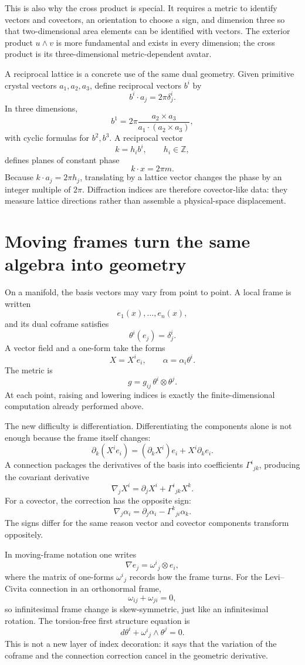 This is also why the cross product is special.  It requires a metric to identify vectors and covectors, an orientation to choose a sign, and dimension three so that two-dimensional area elements can be identified with vectors.  The exterior product \(u\wedge v\) is more fundamental and exists in every dimension; the cross product is its three-dimensional metric-dependent avatar.

A reciprocal lattice is a concrete use of the same dual geometry.  Given primitive crystal vectors \(a_1,a_2,a_3\), define reciprocal vectors \(b^i\) by
\[
  b^i\cdot a_j=2\pi\delta^i_j.
\]
In three dimensions,
\[
  b^1=2\pi\frac{a_2\times a_3}
  {a_1\cdot(a_2\times a_3)},
\]
with cyclic formulas for \(b^2,b^3\).  A reciprocal vector
\[
  k=h_i b^i,
  \qquad h_i\in\mathbb Z,
\]
defines planes of constant phase
\[
  k\cdot x=2\pi m.
\]
Because \(k\cdot a_j=2\pi h_j\), translating by a lattice vector changes the phase by an integer multiple of \(2\pi\).  Diffraction indices are therefore covector-like data: they measure lattice directions rather than assemble a physical-space displacement.

\section{Moving frames turn the same algebra into geometry}

On a manifold, the basis vectors may vary from point to point.  A local frame is written
\[
  e_1(x),\ldots,e_n(x),
\]
and its dual coframe satisfies
\[
  \theta^i(e_j)=\delta^i_j.
\]
A vector field and a one-form take the forms
\[
  X=X^ie_i,
  \qquad
  \alpha=\alpha_i\theta^i.
\]
The metric is
\[
  g=g_{ij}\,\theta^i\otimes\theta^j.
\]
At each point, raising and lowering indices is exactly the finite-dimensional computation already performed above.

The new difficulty is differentiation.  Differentiating the components alone is not enough because the frame itself changes:
\[
  \partial_k(X^ie_i)
  =(\partial_kX^i)e_i+X^i\partial_ke_i.
\]
A connection packages the derivatives of the basis into coefficients \(\Gamma^i{}_{jk}\), producing the covariant derivative
\[
  \nabla_jX^i
  =\partial_jX^i+\Gamma^i{}_{jk}X^k.
\]
For a covector, the correction has the opposite sign:
\[
  \nabla_j\alpha_i
  =\partial_j\alpha_i-\Gamma^k{}_{ji}\alpha_k.
\]
The signs differ for the same reason vector and covector components transform oppositely.

In moving-frame notation one writes
\[
  \nabla e_j=\omega^i{}_j\otimes e_i,
\]
where the matrix of one-forms \(\omega^i{}_j\) records how the frame turns.  For the Levi--Civita connection in an orthonormal frame,
\[
  \omega_{ij}+\omega_{ji}=0,
\]
so infinitesimal frame change is skew-symmetric, just like an infinitesimal rotation.  The torsion-free first structure equation is
\[
  d\theta^i+\omega^i{}_j\wedge\theta^j=0.
\]
This is not a new layer of index decoration: it says that the variation of the coframe and the connection correction cancel in the geometric derivative.

